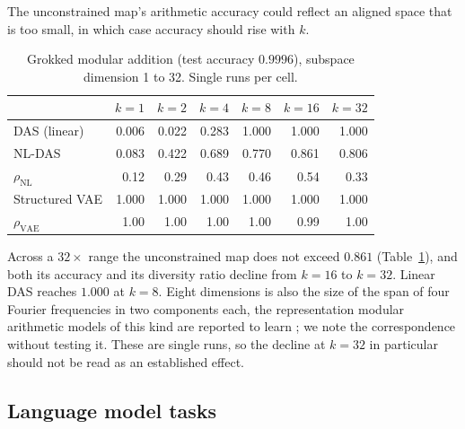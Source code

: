 \documentclass[11pt]{article}
\begin{document}
The unconstrained map's arithmetic accuracy could reflect an aligned space that
is too small, in which case accuracy should rise with $k$.

\begin{table}[t]
\centering
\small
\begin{tabular}{l rrrrrr}
\toprule
& $k{=}1$ & $k{=}2$ & $k{=}4$ & $k{=}8$ & $k{=}16$ & $k{=}32$ \\
\midrule
DAS (linear)          & 0.006 & 0.022 & 0.283 & 1.000 & 1.000 & 1.000 \\
NL-DAS                & 0.083 & 0.422 & 0.689 & 0.770 & 0.861 & 0.806 \\
\quad $\rho_\text{NL}$ & 0.12 & 0.29 & 0.43 & 0.46 & 0.54 & 0.33 \\
Structured VAE        & 1.000 & 1.000 & 1.000 & 1.000 & 1.000 & 1.000 \\
\quad $\rho_\text{VAE}$ & 1.00 & 1.00 & 1.00 & 1.00 & 0.99 & 1.00 \\
\bottomrule
\end{tabular}
\caption{Grokked modular addition (test accuracy $0.9996$), subspace dimension 1
to 32. Single runs per cell.}
\label{tab:ksweep}
\end{table}

Across a $32\times$ range the unconstrained map does not exceed $0.861$
(Table~\ref{tab:ksweep}), and both its accuracy and its diversity ratio decline
from $k = 16$ to $k = 32$. Linear DAS reaches $1.000$ at $k = 8$. Eight
dimensions is also the size of the span of four Fourier frequencies in two
components each, the representation modular arithmetic models of this kind are
reported to learn \citep{nanda2023progress}; we note the correspondence without
testing it. These are single runs, so the decline at $k = 32$ in particular
should not be read as an established effect.

\subsection{Language model tasks}
\label{sec:gpt2}
\end{document}
